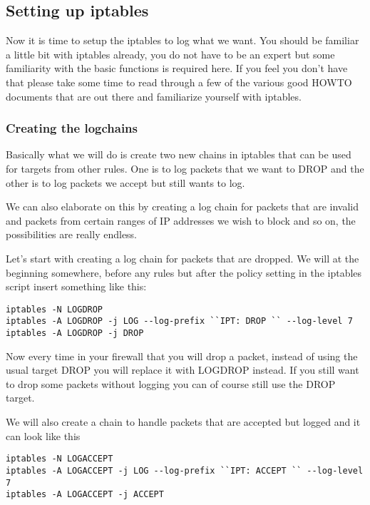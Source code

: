 \documentclass[english,twoside,openright,a4paper,12pt]{article}
\begin{document}
\subsection{Setting up iptables}

Now it is time to setup the iptables to log what we want. You should be familiar a little bit with iptables already, you do not have to be an expert but some familiarity with the basic functions is required here. If you feel you don't have that please take some time to read through a few of the various good HOWTO documents that are out there and familiarize yourself with iptables.

\subsubsection{Creating the logchains}

Basically what we will do is create two new chains in iptables that can be used for targets from other rules. One is to log packets that we want to DROP and the other is to log packets we accept but still wants to log.

We can also elaborate on this by creating a log chain for packets that are invalid and packets from certain ranges of IP addresses we wish to block and so on, the possibilities are really endless.

Let's start with creating a log chain for packets that are dropped. We will at the beginning somewhere, before any rules but after the policy setting in the iptables script insert something like this:

\begin{verbatim}
iptables -N LOGDROP
iptables -A LOGDROP -j LOG --log-prefix ``IPT: DROP `` --log-level 7
iptables -A LOGDROP -j DROP
\end{verbatim}

Now every time in your firewall that you will drop a packet, instead of using the usual target DROP you will replace it with LOGDROP instead. If you still want to drop some packets without logging you can of course still use the DROP target.

We will also create a chain to handle packets that are accepted but logged and it can look like this

\small
\begin{verbatim}
iptables -N LOGACCEPT
iptables -A LOGACCEPT -j LOG --log-prefix ``IPT: ACCEPT `` --log-level 7
iptables -A LOGACCEPT -j ACCEPT
\end{verbatim}
\normalsize
\end{document}
